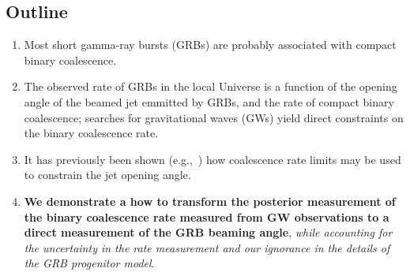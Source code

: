 \documentclass[a0,landscape]{a0poster}
\def\gw#1{gravitational wave#1 (GW#1)\gdef\gw{GW}}
\def\grb#1{gamma-ray burst#1 (GRB#1)\gdef\grb{GRB}}
\begin{document}


\begin{multicols}{4} %


%
%
%


\color{DarkSlateGray} %

\section*{\centering Outline}

\begin{enumerate}
    \item Most short \grb{s} are probably associated with
        compact binary coalescence.
    \item The observed rate of \grb{s} in the local Universe is a function of
        the opening angle of the beamed jet emmitted by \grb{s}, and the rate of
        compact binary coalescence; searches for \gw{s} yield direct constraints
        on the binary coalescence rate.
    \item It has previously been shown
        (e.g.,~\cite{2013PhRvL.111r1101C,2014arXiv1409.8149C}) how coalescence
        rate limits may be used to constrain the jet opening angle.
    \item {\bf We demonstrate a how to transform the posterior measurement of
        the binary coalescence rate measured from \gw{} observations to a direct
    measurement of the \grb{} beaming angle}, \emph{while accounting for the
        uncertainty in the rate measurement and our ignorance in the details of
    the \grb{} progenitor model}.
\end{enumerate}


\end{multicols}
\end{document}
